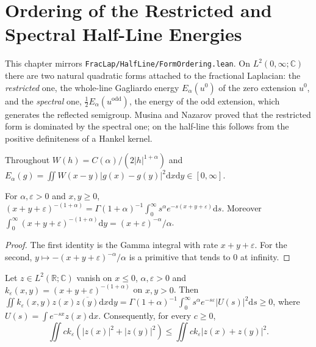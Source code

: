 \chapter{Ordering of the Restricted and Spectral Half-Line Energies}

This chapter mirrors \texttt{FracLap/HalfLine/FormOrdering.lean}. On $L^2(0, \infty; \mathbb{C})$ there are two natural quadratic forms attached to the fractional Laplacian: the \emph{restricted} one, the whole-line Gagliardo energy $E_\alpha(u^0)$ of the zero extension $u^0$, and the \emph{spectral} one, $\tfrac12 E_\alpha(u^{\mathrm{odd}})$, the energy of the odd extension, which generates the reflected semigroup. Musina and Nazarov proved that the restricted form is dominated by the spectral one; on the half-line this follows from the positive definiteness of a Hankel kernel.

Throughout $W(h) = C(\alpha)/(2\lvert h\rvert^{1+\alpha})$ and $E_\alpha(g) = \iint W(x - y)\lvert g(x) - g(y)\rvert^2 \mathrm{d}x \mathrm{d}y \in [0, \infty]$.

\begin{lemma}\label{lem:hankel_laplace}
\leanok
For $\alpha, \varepsilon > 0$ and $x, y \ge 0$, $(x + y + \varepsilon)^{-(1+\alpha)} = \Gamma(1+\alpha)^{-1} \int_0^\infty s^{\alpha} e^{-s(x+y+\varepsilon)} \mathrm{d}s$. Moreover $\int_0^\infty (x + y + \varepsilon)^{-(1+\alpha)} \mathrm{d}y = (x+\varepsilon)^{-\alpha}/\alpha$.
\end{lemma}

\begin{proof}
\leanok
The first identity is the Gamma integral with rate $x + y + \varepsilon$. For the second, $y \mapsto -(x + y + \varepsilon)^{-\alpha}/\alpha$ is a primitive that tends to $0$ at infinity.
\end{proof}

\begin{theorem}\label{thm:hankel_pd}
\leanok
Let $z \in L^2(\mathbb{R}; \mathbb{C})$ vanish on $x \le 0$, $\alpha, \varepsilon > 0$ and $k_\varepsilon(x, y) = (x + y + \varepsilon)^{-(1+\alpha)}$ on $x, y > 0$. Then $\iint k_\varepsilon(x, y) z(x) \overline{z(y)} \mathrm{d}x \mathrm{d}y = \Gamma(1+\alpha)^{-1} \int_0^\infty s^{\alpha} e^{-s\varepsilon} \lvert U(s)\rvert^2 \mathrm{d}s \ge 0$, where $U(s) = \int e^{-sx} z(x) \mathrm{d}x$. Consequently, for every $c \ge 0$,
\[
  \iint c k_\varepsilon (\lvert z(x)\rvert^2 + \lvert z(y)\rvert^2) \le \iint c k_\varepsilon \lvert z(x) + z(y)\rvert^2 .
\]
\end{theorem}

